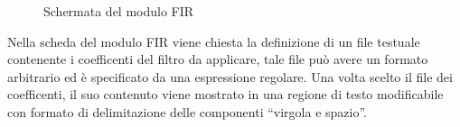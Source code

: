 \documentclass[a4papper]{article}
\begin{document}
\begin{figure}[!h]
  \centering
  \caption{Schermata del modulo FIR}
  \label{}
\end{figure}
\FloatBarrier
Nella scheda del modulo FIR viene chiesta la definizione di un file
testuale contenente i coefficenti del filtro da applicare, tale file
pu\`o avere un formato arbitrario ed \`e specificato da una espressione
regolare. Una volta scelto il file dei coefficenti, il suo contenuto
viene mostrato in una regione di testo modificabile con formato di
delimitazione delle componenti ``virgola e spazio''.
\end{document}

